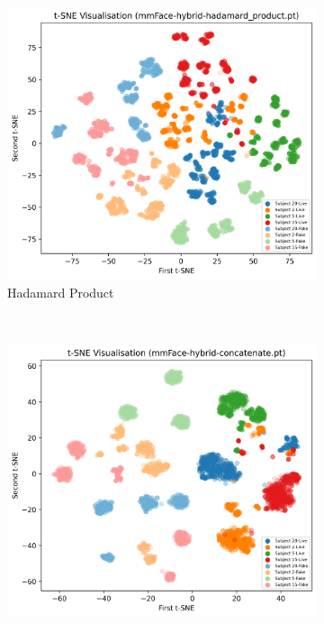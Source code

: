 \documentclass{mpaper}
\begin{document}
\begin{figure}[!htb] 
    \centering
    \begin{subfigure}[b]{0.3\textwidth}
        \includegraphics[width=\textwidth]{figures/tsne_hadamard_product.png}
        \caption{Hadamard Product}
        \label{fig:tsne_hadamard_product}
    \end{subfigure}
    ~
    \begin{subfigure}[b]{0.3\textwidth}
        \includegraphics[width=\textwidth]{figures/tsne_concatenate.png}

\end{subfigure}
\end{figure}
\end{document}
